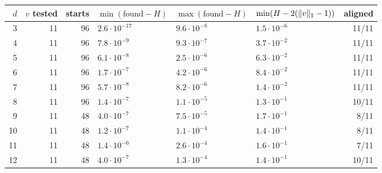 \begin{tabular}{r r r l l l r}
\toprule
$d$ & $v$ tested & starts & $\min(\text{found}-H)$ & $\max(\text{found}-H)$ & $\min(H-2(\lVert v\rVert_1-1))$ & aligned \\
\midrule
3 & 11 & 96 & $2.6\cdot10^{-17}$ & $9.6\cdot10^{-8}$ & $1.5\cdot10^{-6}$ & 11/11 \\
4 & 11 & 96 & $7.8\cdot10^{-9}$ & $9.3\cdot10^{-7}$ & $3.7\cdot10^{-2}$ & 11/11 \\
5 & 11 & 96 & $6.1\cdot10^{-8}$ & $2.5\cdot10^{-6}$ & $6.3\cdot10^{-2}$ & 11/11 \\
6 & 11 & 96 & $1.7\cdot10^{-7}$ & $4.2\cdot10^{-6}$ & $8.4\cdot10^{-2}$ & 11/11 \\
7 & 11 & 96 & $5.7\cdot10^{-8}$ & $8.2\cdot10^{-6}$ & $1.4\cdot10^{-2}$ & 11/11 \\
8 & 11 & 96 & $1.4\cdot10^{-7}$ & $1.1\cdot10^{-5}$ & $1.3\cdot10^{-1}$ & 10/11 \\
9 & 11 & 48 & $4.0\cdot10^{-7}$ & $7.5\cdot10^{-5}$ & $1.7\cdot10^{-1}$ & 8/11 \\
10 & 11 & 48 & $1.2\cdot10^{-7}$ & $1.1\cdot10^{-4}$ & $1.4\cdot10^{-1}$ & 8/11 \\
11 & 11 & 48 & $1.4\cdot10^{-6}$ & $2.6\cdot10^{-4}$ & $1.6\cdot10^{-1}$ & 7/11 \\
12 & 11 & 48 & $4.0\cdot10^{-7}$ & $1.3\cdot10^{-4}$ & $1.4\cdot10^{-1}$ & 10/11 \\
\bottomrule
\end{tabular}
